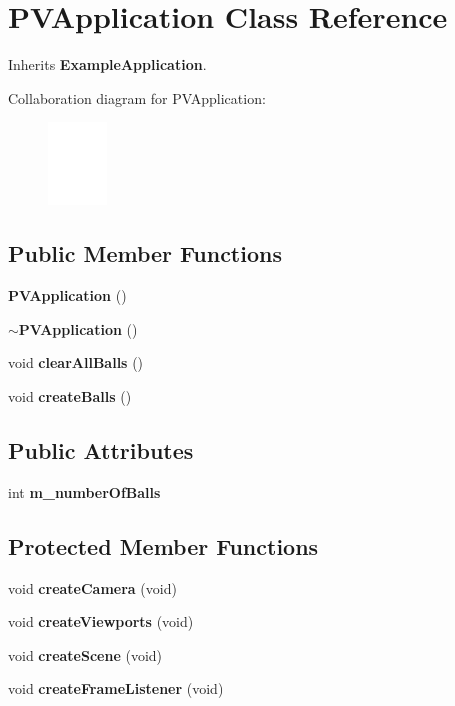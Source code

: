 \section{PVApplication Class Reference}
\label{class_p_v_application}
Inherits {\bf ExampleApplication}.

Collaboration diagram for PVApplication:\nopagebreak
\begin{figure}[H]
\begin{center}
\leavevmode
\includegraphics[width=44pt]{class_p_v_application__coll__graph}
\end{center}
\end{figure}
\subsection*{Public Member Functions}
\begin{CompactItemize}
\item 
{\bf PVApplication} ()
\item 
{\bf $\sim$PVApplication} ()
\item 
void {\bf clearAllBalls} ()
\item 
void {\bf createBalls} ()
\end{CompactItemize}
\subsection*{Public Attributes}
\begin{CompactItemize}
\item 
int {\bf m\_\-numberOfBalls}
\end{CompactItemize}
\subsection*{Protected Member Functions}
\begin{CompactItemize}
\item 
void {\bf createCamera} (void)
\item 
void {\bf createViewports} (void)
\item 
void {\bf createScene} (void)
\item 
void {\bf createFrameListener} (void)
\end{CompactItemize}
